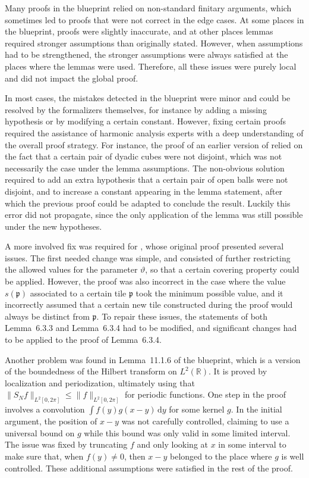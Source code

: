 \documentclass[12pt]{amsart}
\newcommand*{\ud}{\, \mathrm{d}}
\newcommand*{\real}{\mathbb{R}} %
\theoremstyle{definition}
\theoremstyle{plain}
\begin{document}
Many proofs in the blueprint relied on non-standard finitary arguments, which sometimes led to proofs that were not correct in the edge cases.
At some places in the blueprint, proofs were slightly inaccurate, and at other places lemmas required stronger assumptions than originally stated. However, when assumptions had to be strengthened, the
stronger assumptions were always satisfied at the places where the lemmas
were used. Therefore, all these issues were purely local and did not impact the global proof.


In most cases, the mistakes detected in the blueprint were minor and could be resolved by the formalizers themselves, for instance by adding a missing hypothesis or by modifying a certain constant. However, fixing certain proofs required the assistance of harmonic analysis experts with a deep understanding of the overall proof strategy. For instance, the proof of an earlier version of \cite[Lemma~6.2.3]{CarlesonBlueprint} relied on the fact that a certain pair of dyadic cubes were not disjoint, which was not necessarily the case under the lemma assumptions. The non-obvious solution required to add an extra hypothesis that a certain pair of open balls were not disjoint, and to increase a constant appearing in the lemma statement, after which the previous proof could be adapted to conclude the result. Luckily this error did not propagate, since the only application of the lemma was still possible under the new hypotheses.

A more involved fix was required for \cite[Lemma~6.3.4]{CarlesonBlueprint}, whose original proof presented several issues. The first needed change was simple, and consisted of further restricting the allowed values for the parameter $\vartheta$, so that a certain covering property could be applied. However, the proof was also incorrect in the case where the value $s(\mathfrak{p})$ associated to a certain tile $\mathfrak{p}$ took the minimum possible value, and it incorrectly assumed that a certain new tile constructed during the proof would always be distinct from $\mathfrak{p}$. To repair these issues, the statements of both Lemma~6.3.3 and Lemma~6.3.4 had to be modified, and significant changes had to be applied to the proof of Lemma~6.3.4.

Another problem was found in Lemma~11.1.6 of the blueprint, which is a version of the boundedness of the
Hilbert transform on $L^2(\real)$. It is proved by localization and
periodization, ultimately using that $\|S_N f\|_{L^2[0,2\pi]} \leq
\|f\|_{L^2[0,2\pi]}$ for periodic functions. One step in the proof
involves a convolution $\int f(y) g(x-y) \ud y$ for some kernel $g$. In
the initial argument, the position of $x-y$ was not carefully
controlled, claiming to use a universal bound on $g$ while this bound
was only valid in some limited interval. The issue was fixed by
truncating $f$ and only looking at $x$ in some interval to make sure
that, when $f(y)\ne 0$, then $x-y$ belonged to the place where $g$ is
well controlled. These additional assumptions were satisfied in the
rest of the proof.
\end{document}
